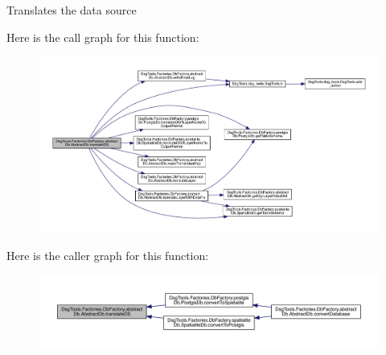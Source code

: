 \begin{DoxyVerb}Translates the data source
\end{DoxyVerb}
 Here is the call graph for this function\+:
\nopagebreak
\begin{figure}[H]
\begin{center}
\leavevmode
\includegraphics[width=350pt]{class_dsg_tools_1_1_factories_1_1_db_factory_1_1abstract_db_1_1_abstract_db_a93b2e3ffcb0f8c324930af3e656cca76_cgraph}
\end{center}
\end{figure}
Here is the caller graph for this function\+:
\nopagebreak
\begin{figure}[H]
\begin{center}
\leavevmode
\includegraphics[width=350pt]{class_dsg_tools_1_1_factories_1_1_db_factory_1_1abstract_db_1_1_abstract_db_a93b2e3ffcb0f8c324930af3e656cca76_icgraph}
\end{center}
\end{figure}
\mbox{\label{class_dsg_tools_1_1_factories_1_1_db_factory_1_1abstract_db_1_1_abstract_db_a4b923803b78556b8c1f812e44345c460}} 
